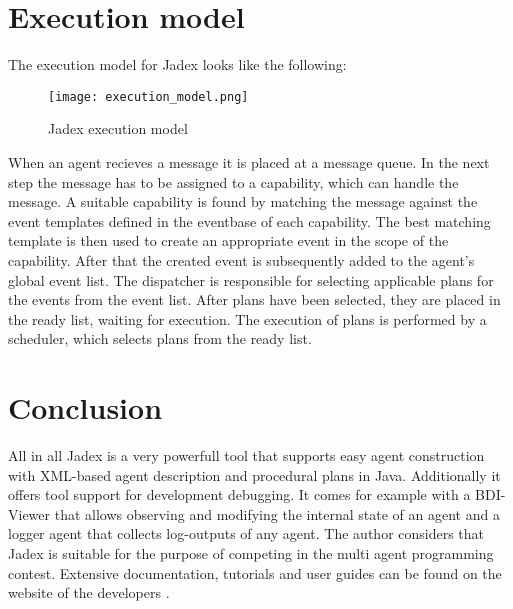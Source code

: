 \documentclass{llncs}
\begin{document}
\section{Execution model}
The execution model for Jadex looks like the following:
\begin{figure}
	\centering
	\texttt{[image: execution\_model.png]}
	\label{fig3}
	\caption{Jadex execution model \cite{Pokahr}}
\end{figure}
\newline
When an agent recieves a message it is placed at a message queue. In the next step the message has to be assigned to a capability, which can handle the message. A suitable capability is found by matching the message against the event templates defined in the eventbase of each capability. The best matching template is then used to create an appropriate event in the scope of the capability. After that the created event is subsequently added to the agent's global event list. The dispatcher is responsible for selecting applicable plans for the events from the event list. After plans have been selected, they are placed in the ready list, waiting for execution. The execution of plans is performed by a scheduler, which selects plans from the ready list. 

\section{Conclusion}
All in all Jadex is a very powerfull tool that supports easy agent construction with XML-based agent description and procedural plans in Java. Additionally it offers tool support for development debugging. It comes for example with a BDI-Viewer that allows observing and modifying the internal state of an agent and a logger agent that collects log-outputs of any agent. The author considers that Jadex is suitable for the purpose of competing in the multi agent programming contest. Extensive documentation, tutorials and user guides can be found on the website of the developers \cite{Jadex}.

\newpage



\end{document}
